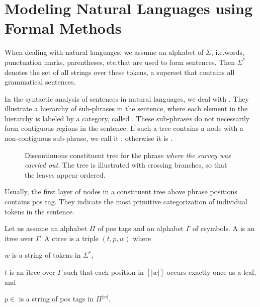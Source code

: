 \documentclass[../document.tex]{subfiles}
\begin{document}
    \section{Modeling Natural Languages using Formal Methods}\label{sec:preliminaries:ctrees}
    When dealing with natural languages, we assume an \gls*{alphabet} of  \(\Sigma\), i.e.\@ words, punctuation marks, parentheses, etc.\@ that are used to form sentences.
    Then \(\Sigma^*\) denotes the set of all strings over these tokens, a superset that contains all grammatical sentences.

    In the syntactic analysis of sentences in natural languages, we deal with .
    They illustrate a hierarchy of sub-phrases in the sentence, where each element in the hierarchy is labeled by a category, called .
    These sub-phrases do not necessarily form contiguous regions in the sentence:
    If such a tree contains a node with a non-contiguous sub-phrase, we call it ; otherwise it is .

    \begin{figure}
        \null\hfill
        
%        
        \hfill\null

        \caption{\label{fig:pre:ctree}
            Discontinuous constituent tree for the phrase \emph{where the survey was carried out}.
            The tree is illustrated with crossing branches, so that the leaves appear ordered.
        }
    \end{figure}

    Usually, the first layer of nodes in a constituent tree above phrase positions contains \gls{pos} tag.
    They indicate the most primitive categorization of individual tokens in the sentence.

    Let us assume an \gls*{alphabet} \(\varPi\) of \gls*{pos} tags and an \gls*{alphabet} \(\varGamma\) of \glspl{csymbol}.
    A  is an \gls{itree} over \(\varGamma\).
    A \gls{ctree} is a triple \((t, p, w)\) where
    \begin{compactitem}
        \item \(w\) is a \gls*{string} of tokens in \(\varSigma^*\),
        \item \(t\) is an \gls*{itree} over \(\varGamma\) such that each position in \([|w|]\) occurs exactly once as a leaf, and
        \item \(p \in \) is a \gls*{string} of \gls*{pos} tags in \(\varPi^{|w|}\).
    \end{compactitem}
%
\end{document}
